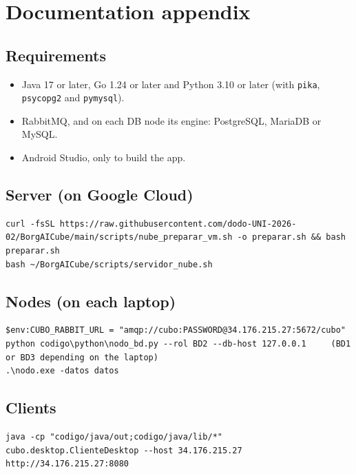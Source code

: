 \documentclass[10pt,a4paper]{article}
\begin{document}
\section{Documentation appendix}

\subsection*{Requirements}

\begin{itemize}
    \item Java 17 or later, Go 1.24 or later and Python 3.10 or later (with \texttt{pika},
    \texttt{psycopg2} and \texttt{pymysql}).
    \item RabbitMQ, and on each DB node its engine: PostgreSQL, MariaDB or MySQL.
    \item Android Studio, only to build the app.
\end{itemize}

\subsection*{Server (on Google Cloud)}

\begin{lstlisting}[language={},numbers=none]
curl -fsSL https://raw.githubusercontent.com/dodo-UNI-2026-02/BorgAICube/main/scripts/nube_preparar_vm.sh -o preparar.sh && bash preparar.sh
bash ~/BorgAICube/scripts/servidor_nube.sh
\end{lstlisting}

\subsection*{Nodes (on each laptop)}

\begin{lstlisting}[language={},numbers=none]
$env:CUBO_RABBIT_URL = "amqp://cubo:PASSWORD@34.176.215.27:5672/cubo"
python codigo\python\nodo_bd.py --rol BD2 --db-host 127.0.0.1     (BD1 or BD3 depending on the laptop)
.\nodo.exe -datos datos
\end{lstlisting}

\subsection*{Clients}

\begin{lstlisting}[language={},numbers=none]
java -cp "codigo/java/out;codigo/java/lib/*" cubo.desktop.ClienteDesktop --host 34.176.215.27
http://34.176.215.27:8080
\end{lstlisting}
\end{document}
